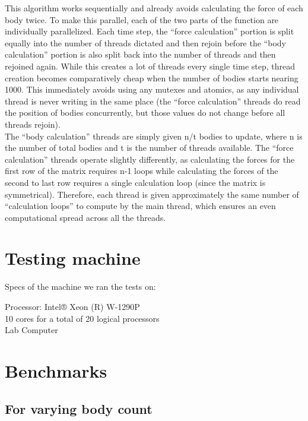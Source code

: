 \documentclass{article}
\begin{document}
This algorithm works sequentially and already avoids calculating the force of each body twice. To make this parallel, each of the two parts of the function are individually parallelized. Each time step, the “force calculation” portion is split equally into the number of threads dictated and then rejoin before the “body calculation” portion is also split back into the number of threads and then rejoined again. While this creates a lot of threads every single time step, thread creation becomes comparatively cheap when the number of bodies starts nearing 1000. This immediately avoids using any mutexes and atomics, as any individual thread is never writing in the same place (the “force calculation” threads do read the position of bodies concurrently, but those values do not change before all threads rejoin).\\


The “body calculation” threads are simply given n/t bodies to update, where n is the number of total bodies and t is the number of threads available. The “force calculation” threads operate slightly differently, as calculating the forces for the first row of the matrix requires n-1 loops while calculating the forces of the second to last row requires a single calculation loop (since the matrix is symmetrical). Therefore, each thread is given approximately the same number of “calculation loops” to compute by the main thread, which ensures an even computational spread across all the threads.

\section{Testing machine}
Specs of the machine we ran the tests on:

Processor: Intel® Xeon (R) W-1290P\\
10 cores for a total of 20 logical processors\\
Lab Computer

\section{Benchmarks}
\subsection{For varying body count}
\end{document}
